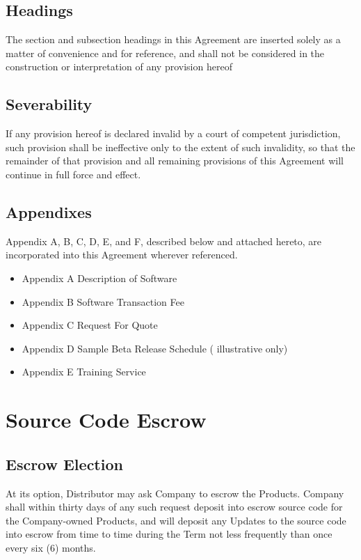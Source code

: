 \documentclass[letterpaper,10pt,openany,oneside,english]{sphinxmanual}
\begin{document}
\subsection{Headings}
\label{\detokenize{miscellaneous:headings}}
The section and subsection headings in this Agreement are inserted solely as a matter of convenience and for reference, and shall not be considered in the construction or interpretation of any provision hereof


\subsection{Severability}
\label{\detokenize{miscellaneous:severability}}
If any provision hereof is declared invalid by a court of competent jurisdiction, such provision shall be ineffective only to the extent of such invalidity, so that the remainder of that provision and all remaining provisions of this Agreement will continue in full force and effect.


\subsection{Appendixes}
\label{\detokenize{miscellaneous:appendixes}}
Appendix A, B, C, D, E, and F, described below and attached hereto, are incorporated into this Agreement wherever referenced.
\begin{itemize}
\item {} 
Appendix A    Description of Software

\item {} 
Appendix B    Software Transaction Fee

\item {} 
Appendix C    Request For Quote

\item {} 
Appendix D    Sample Beta Release Schedule ( illustrative only)

\item {} 
Appendix E    Training Service

\end{itemize}


\section{Source Code Escrow}
\label{\detokenize{escrow:source-code-escrow}}\label{\detokenize{escrow::doc}}

\subsection{Escrow Election}
\label{\detokenize{escrow:escrow-election}}
At its option, Distributor may ask Company to escrow the Products.  Company shall within thirty days of any such request deposit into escrow source code for the Company-owned Products, and will deposit any Updates to the source code into escrow from time to time during the Term not less frequently than once every six (6) months.
\end{document}
